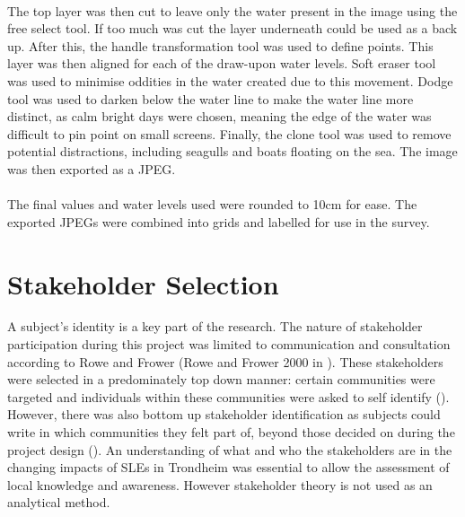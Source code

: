 \paragraph{}
The top layer was then cut to leave only the water present in the image using the free select tool. If too much was cut the layer underneath could be used as a back up. After this, the handle transformation tool was used to define points. This layer was then aligned for each of the draw-upon water levels. Soft eraser tool was used to minimise oddities in the water created due to this movement. Dodge tool was used to darken below the water line to make the water line more distinct, as calm bright days were chosen, meaning the edge of the water was difficult to pin point on small screens. Finally, the clone tool was used to remove potential distractions, including seagulls and boats floating on the sea. The image was then exported as a JPEG. 

\paragraph{}
The final values and water levels used were rounded to 10cm for ease. The exported JPEGs were combined into grids and labelled for use in the survey. 

\section{Stakeholder Selection}
A subject's identity is a key part of the research. The nature of stakeholder participation during this project was limited to communication and consultation according to Rowe and Frower  (Rowe and Frower 2000 in \cite{reed_stakeholder_nodate}). These stakeholders were selected in a predominately top down manner:  certain communities were targeted and individuals within these communities were asked to self identify (\cite{reed_stakeholder_nodate}). However, there was also bottom up stakeholder identification as subjects could write in which communities they felt part of, beyond those decided on during the project design (\cite{reed_stakeholder_nodate}). An understanding of what and who the stakeholders are in the changing impacts of SLEs in Trondheim was essential to allow the assessment of local knowledge and awareness. However stakeholder theory is not used as an analytical method.
\paragraph{}

